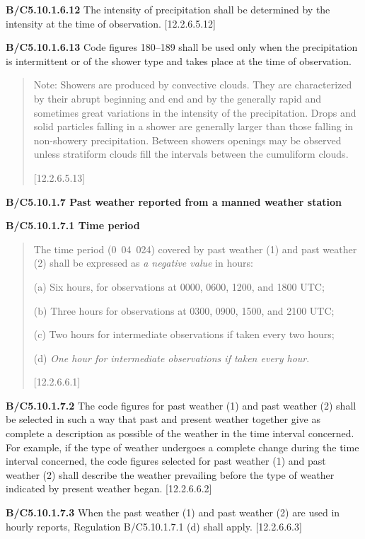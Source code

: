 \textbf{B/C5.10.1.6.12} The intensity of precipitation shall be determined by the intensity at the time of observation. {[}12.2.6.5.12{]}

\textbf{B/C5.10.1.6.13} Code figures 180--189 shall be used only when the precipitation is intermittent or of the shower type and takes place at the time of observation.

\begin{quote}
Note: Showers are produced by convective clouds. They are characterized by their abrupt beginning and end and by the generally rapid and sometimes great variations in the intensity of the precipitation. Drops and solid particles falling in a shower are generally larger than those falling in non-showery precipitation. Between showers openings may be observed unless stratiform clouds fill the intervals between the cumuliform clouds.

{[}12.2.6.5.13{]}
\end{quote}

\textbf{B/C5.10.1.7 Past weather reported from a manned weather station}

\textbf{B/C5.10.1.7.1 Time period}

\begin{quote}
The time period (0~04~024) covered by past weather (1) and past weather (2) shall be expressed as \emph{a negative value} in hours:

(a) Six hours, for observations at 0000, 0600, 1200, and 1800 UTC;

(b) Three hours for observations at 0300, 0900, 1500, and 2100 UTC;

(c) Two hours for intermediate observations if taken every two hours;

(d) \emph{One hour for intermediate observations if taken every hour}.

{[}12.2.6.6.1{]}
\end{quote}

\textbf{B/C5.10.1.7.2} The code figures for past weather (1) and past weather (2) shall be selected in such a way that past and present weather together give as complete a description as possible of the weather in the time interval concerned. For example, if the type of weather undergoes a complete change during the time interval concerned, the code figures selected for past weather (1) and past weather (2) shall describe the weather prevailing before the type of weather indicated by present weather began. {[}12.2.6.6.2{]}

\textbf{B/C5.10.1.7.3} When the past weather (1) and past weather (2) are used in hourly reports, Regulation B/C5.10.1.7.1 (d) shall apply. {[}12.2.6.6.3{]}

